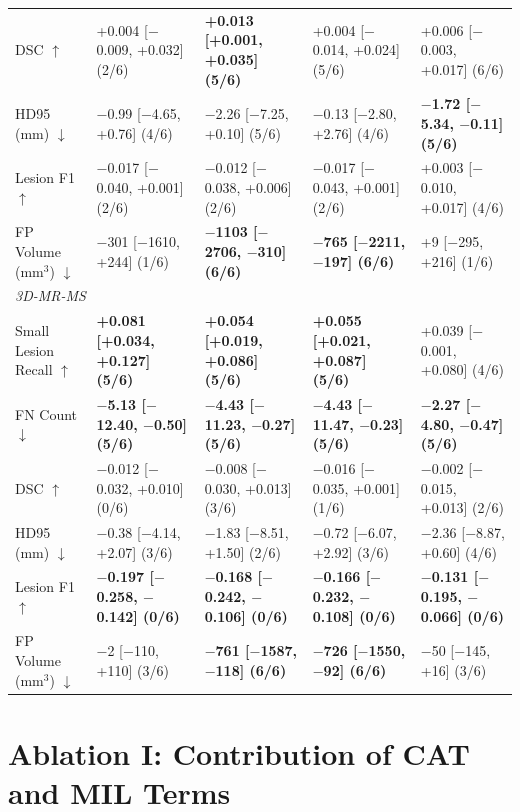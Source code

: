 \begin{table}[t]
{\begin{tabular}{lllll}
DSC $\uparrow$ & +0.004 [$-$0.009, +0.032] (2/6) & \textbf{+0.013 [+0.001, +0.035] (5/6)} & +0.004 [$-$0.014, +0.024] (5/6) & +0.006 [$-$0.003, +0.017] (6/6) \\
HD95 (mm) $\downarrow$ & $-$0.99 [$-$4.65, +0.76] (4/6) & $-$2.26 [$-$7.25, +0.10] (5/6) & $-$0.13 [$-$2.80, +2.76] (4/6) & \textbf{$-$1.72 [$-$5.34, $-$0.11] (5/6)} \\
Lesion F1 $\uparrow$ & $-$0.017 [$-$0.040, +0.001] (2/6) & $-$0.012 [$-$0.038, +0.006] (2/6) & $-$0.017 [$-$0.043, +0.001] (2/6) & +0.003 [$-$0.010, +0.017] (4/6) \\
FP Volume (mm$^3$) $\downarrow$ & $-$301 [$-$1610, +244] (1/6) & \textbf{$-$1103 [$-$2706, $-$310] (6/6)} & \textbf{$-$765 [$-$2211, $-$197] (6/6)} & +9 [$-$295, +216] (1/6) \\
\midrule
\multicolumn{5}{l}{\emph{3D-MR-MS}} \\
Small Lesion Recall $\uparrow$ & \textbf{+0.081 [+0.034, +0.127] (5/6)} & \textbf{+0.054 [+0.019, +0.086] (5/6)} & \textbf{+0.055 [+0.021, +0.087] (5/6)} & +0.039 [$-$0.001, +0.080] (4/6) \\
FN Count $\downarrow$ & \textbf{$-$5.13 [$-$12.40, $-$0.50] (5/6)} & \textbf{$-$4.43 [$-$11.23, $-$0.27] (5/6)} & \textbf{$-$4.43 [$-$11.47, $-$0.23] (5/6)} & \textbf{$-$2.27 [$-$4.80, $-$0.47] (5/6)} \\
DSC $\uparrow$ & $-$0.012 [$-$0.032, +0.010] (0/6) & $-$0.008 [$-$0.030, +0.013] (3/6) & $-$0.016 [$-$0.035, +0.001] (1/6) & $-$0.002 [$-$0.015, +0.013] (2/6) \\
HD95 (mm) $\downarrow$ & $-$0.38 [$-$4.14, +2.07] (3/6) & $-$1.83 [$-$8.51, +1.50] (2/6) & $-$0.72 [$-$6.07, +2.92] (3/6) & $-$2.36 [$-$8.87, +0.60] (4/6) \\
Lesion F1 $\uparrow$ & \textbf{$-$0.197 [$-$0.258, $-$0.142] (0/6)} & \textbf{$-$0.168 [$-$0.242, $-$0.106] (0/6)} & \textbf{$-$0.166 [$-$0.232, $-$0.108] (0/6)} & \textbf{$-$0.131 [$-$0.195, $-$0.066] (0/6)} \\
FP Volume (mm$^3$) $\downarrow$ & $-$2 [$-$110, +110] (3/6) & \textbf{$-$761 [$-$1587, $-$118] (6/6)} & \textbf{$-$726 [$-$1550, $-$92] (6/6)} & $-$50 [$-$145, +16] (3/6) \\
\bottomrule
\end{tabular}%
}
\end{table}

\section{Ablation I: Contribution of CAT and MIL Terms}
\label{appendix:catmil-components}

